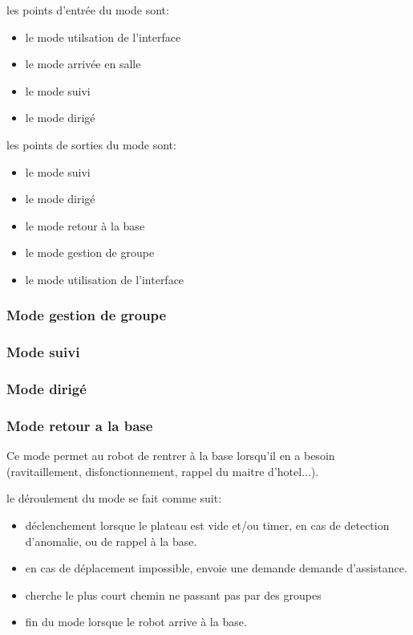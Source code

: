 les points d'entrée du mode sont:
\begin{itemize}
\item le mode utilsation de l'interface
\item le mode arrivée en salle
\item le mode suivi
\item le mode dirigé\\
\end{itemize}

les points de sorties du mode sont:
\begin{itemize}
\item le mode suivi
\item le mode dirigé
\item le mode retour à la base
\item le mode gestion de groupe
\item le mode utilisation de l'interface\\
\end{itemize}

\subsubsection{Mode gestion de groupe}

\subsubsection{Mode suivi}

\subsubsection{Mode dirigé}

\subsubsection{Mode retour a la base}

Ce mode permet au robot de rentrer à la base lorsqu'il en a besoin
(ravitaillement, disfonctionnement, rappel du maitre d'hotel...).

le déroulement du mode se fait comme suit:
\begin{itemize}
\item déclenchement lorsque le plateau est vide et/ou timer, en cas de
  detection d'anomalie, ou de rappel à la base.
\item en cas de déplacement impossible, envoie une demande demande
  d'assistance.
\item cherche le plus court chemin ne passant pas par des groupes
\item fin du mode lorsque le robot arrive à la base.\\
\end{itemize}

